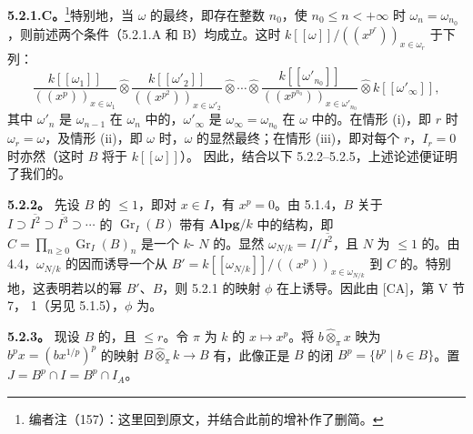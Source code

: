 \textbf{5.2.1.C。}\footnote{编者注（157）：这里回到原文，并结合此前的增补作了删简。}特别地，当 $\omega$ 的最终，即存在整数 $n_0$，使 $n_0\leq n<+\infty$ 时 $\omega_n=\omega_{n_0}$，则前述两个条件（5.2.1.A 和 B）均成立。这时 $k[[\omega]]/((x^{p^r}))_{x\in\omega_r}$ 于下列：
\[
\frac{k[[\omega_1]]}{((x^p))_{x\in\omega_1}}
\widehat\otimes\frac{k[[\omega'_2]]}{((x^{p^2}))_{x\in\omega'_2}}
\widehat\otimes\cdots\widehat\otimes
\frac{k[[\omega'_{n_0}]]}{((x^{p^{n_0}}))_{x\in\omega'_{n_0}}}
\widehat\otimes k[[\omega'_\infty]],
\]
其中 $\omega'_n$ 是 $\omega_{n-1}$ 在 $\omega_n$ 中的，$\omega'_\infty$ 是 $\omega_\infty=\omega_{n_0}$ 在 $\omega$ 中的。在情形 (i)，即 $r$ 时 $\omega_r=\omega$，及情形 (ii)，即 $\omega$ 时，$\omega$ 的显然最终；在情形 (iii)，即对每个 $r$，$I_r=0$ 时亦然（这时 $B$ 将于 $k[[\omega]]$）。
因此，结合以下 5.2.2--5.2.5，上述论述便证明了我们的。

\textbf{5.2.2。} 先设 $B$ 的 $\leq1$，即对 $x\in I$，有 $x^p=0$。由 5.1.4，$B$ 关于 $I\supset\overline{I^2}\supset\overline{I^3}\supset\cdots$ 的 $\operatorname{Gr}_I(B)$ 带有 $\mathbf{Alpg}/k$ 中的结构，即 $C=\prod_{n\geq0}\operatorname{Gr}_I(B)_n$ 是一个 $k$- $N$ 的。显然 $\omega_{N/k}=I/\overline{I^2}$，且 $N$ 为 $\leq1$ 的。由 4.4，$\omega_{N/k}$ 的因而诱导一个从 $B'=k[[\omega_{N/k}]]/((x^p))_{x\in\omega_{N/k}}$ 到 $C$ 的。特别地，这表明若以的幂 $B'$、$B$，则 5.2.1 的映射 $\phi$ 在上诱导。因此由 [CA]，第 V 节 7， 1（另见 5.1.5），$\phi$ 为。

\textbf{5.2.3。} 现设 $B$ 的，且 $\leq r$。令 $\pi$ 为 $k$ 的 $x\mapsto x^p$。将 $b\widehat\otimes_\pi x$ 映为 $b^px=(bx^{1/p})^p$ 的映射 $B\widehat\otimes_\pi k\to B$ 有，此像正是 $B$ 的闭 $B^p=\{b^p\mid b\in B\}$。置 $J=B^p\cap I=B^p\cap I_A$。


